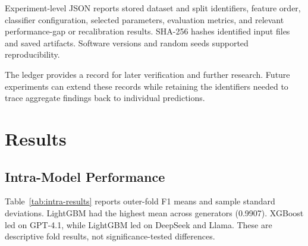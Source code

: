 \documentclass[conference]{IEEEtran}
\begin{document}
Experiment-level JSON reports stored dataset and split
identifiers, feature order, classifier configuration, selected
parameters, evaluation metrics, and relevant performance-gap
or recalibration results. SHA-256 hashes identified input
files and saved artifacts. Software versions and random seeds
supported reproducibility.

The ledger provides a record for later verification and further
research. Future experiments can extend these records while
retaining the identifiers needed to trace aggregate findings
back to individual predictions.


\section{Results}
\label{sec:results}

\subsection{Intra-Model Performance}

Table~\ref{tab:intra-results} reports outer-fold F1 means and
sample standard deviations. LightGBM had the highest mean
across generators (0.9907). XGBoost led on GPT-4.1, while
LightGBM led on DeepSeek and Llama. These are descriptive
fold results, not significance-tested differences.
\end{document}
